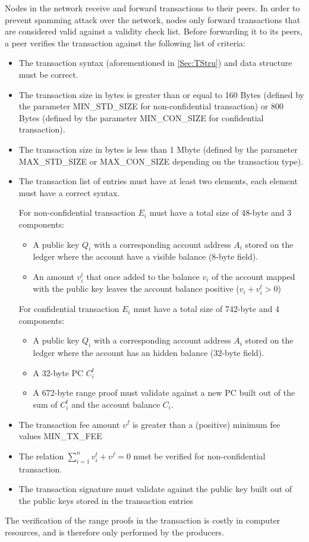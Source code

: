 Nodes in the network receive and forward transactions to their peers. In order to prevent spamming attack over the network,  nodes only forward transactions that are considered valid against a validity check list. Before forwarding it to its peers, a peer verifies the transaction against the following list of criteria:
 
\begin{itemize}
\item The transaction syntax (aforementioned in \ref{Sec:TStru}) and data structure must be correct.
\item The transaction size in bytes is greater than or equal to 160 Bytes (defined by the parameter MIN\_STD\_SIZE for non-confidential transaction) or 800 Bytes (defined by the parameter MIN\_CON\_SIZE for confidential transaction).
\item The transaction size in bytes is less than 1 Mbyte (defined by the parameter MAX\_STD\_SIZE or MAX\_CON\_SIZE depending on the transaction type).
\item The transaction list of entries must have at least two elements, each element must have a correct syntax. 

For non-confidential transaction $E_i$ must have a total size of 48-byte and 3 components:
\begin{itemize}
\item A public key $Q_i$ with a corresponding account address $A_i$ stored on the ledger where the account have a visible balance (8-byte field).
\item An amount $v_i^t$ that once added to the balance $v_i$ of the account mapped with the public key leaves the account balance positive ($v_i+v_i^t > 0$)
\end{itemize}
For confidential transaction $E_i$ must have a total size of 742-byte and 4 components:

\begin{itemize}
\item A public key $Q_i$ with a corresponding account address $A_i$ stored on the ledger where the account has an hidden balance (32-byte field).   
\item A 32-byte PC $C_i^t$ 
\item A 672-byte range proof must validate against a new PC built out of the sum of $C_i^t$ and the account balance $C_i$. 
\end{itemize}

\item The transaction fee amount $v^f$ is greater than a (positive) minimum fee values MIN\_TX\_FEE
\item The relation $\sum_{i=1}^{n}v^t_i + v^f = 0$ must be verified for non-confidential transaction.
\item The transaction signature must validate against the public key built out of the public keys stored in the transaction entries 
\end{itemize}

The verification of the range proofs in the transaction is costly in computer resources, and is therefore only performed by the producers. 